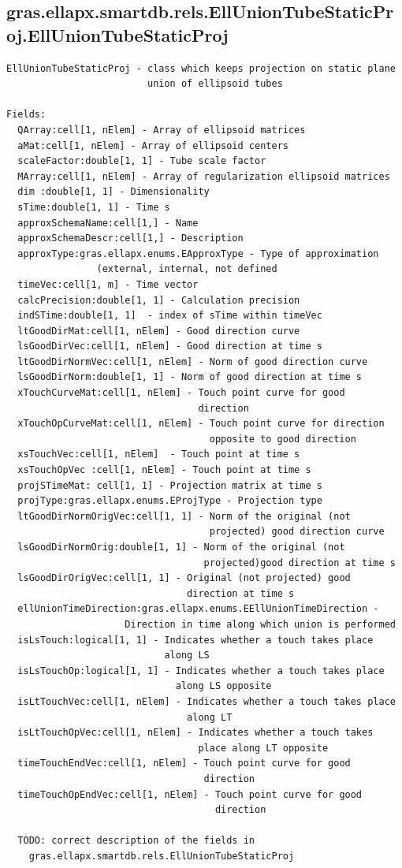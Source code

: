 \documentclass[letterpaper,10pt,english]{sphinxmanual}
\begin{document}
\subsection{gras.ellapx.smartdb.rels.EllUnionTubeStaticProj.EllUnionTubeStaticProj}
\label{chap_functions:gras-ellapx-smartdb-rels-elluniontubestaticproj-elluniontubestaticproj}
\begin{Verbatim}[commandchars=\\\{\}]
EllUnionTubeStaticProj - class which keeps projection on static plane
                         union of ellipsoid tubes

Fields:
  QArray:cell[1, nElem] - Array of ellipsoid matrices
  aMat:cell[1, nElem] - Array of ellipsoid centers
  scaleFactor:double[1, 1] - Tube scale factor
  MArray:cell[1, nElem] - Array of regularization ellipsoid matrices
  dim :double[1, 1] - Dimensionality
  sTime:double[1, 1] - Time s
  approxSchemaName:cell[1,] - Name
  approxSchemaDescr:cell[1,] - Description
  approxType:gras.ellapx.enums.EApproxType - Type of approximation
                (external, internal, not defined
  timeVec:cell[1, m] - Time vector
  calcPrecision:double[1, 1] - Calculation precision
  indSTime:double[1, 1]  - index of sTime within timeVec
  ltGoodDirMat:cell[1, nElem] - Good direction curve
  lsGoodDirVec:cell[1, nElem] - Good direction at time s
  ltGoodDirNormVec:cell[1, nElem] - Norm of good direction curve
  lsGoodDirNorm:double[1, 1] - Norm of good direction at time s
  xTouchCurveMat:cell[1, nElem] - Touch point curve for good
                                  direction
  xTouchOpCurveMat:cell[1, nElem] - Touch point curve for direction
                                    opposite to good direction
  xsTouchVec:cell[1, nElem]  - Touch point at time s
  xsTouchOpVec :cell[1, nElem] - Touch point at time s
  projSTimeMat: cell[1, 1] - Projection matrix at time s
  projType:gras.ellapx.enums.EProjType - Projection type
  ltGoodDirNormOrigVec:cell[1, 1] - Norm of the original (not
                                    projected) good direction curve
  lsGoodDirNormOrig:double[1, 1] - Norm of the original (not
                                   projected)good direction at time s
  lsGoodDirOrigVec:cell[1, 1] - Original (not projected) good
                                direction at time s
  ellUnionTimeDirection:gras.ellapx.enums.EEllUnionTimeDirection -
                     Direction in time along which union is performed
  isLsTouch:logical[1, 1] - Indicates whether a touch takes place
                            along LS
  isLsTouchOp:logical[1, 1] - Indicates whether a touch takes place
                              along LS opposite
  isLtTouchVec:cell[1, nElem] - Indicates whether a touch takes place
                                along LT
  isLtTouchOpVec:cell[1, nElem] - Indicates whether a touch takes
                                  place along LT opposite
  timeTouchEndVec:cell[1, nElem] - Touch point curve for good
                                   direction
  timeTouchOpEndVec:cell[1, nElem] - Touch point curve for good
                                     direction

  TODO: correct description of the fields in
    gras.ellapx.smartdb.rels.EllUnionTubeStaticProj
\end{Verbatim}
\end{document}
